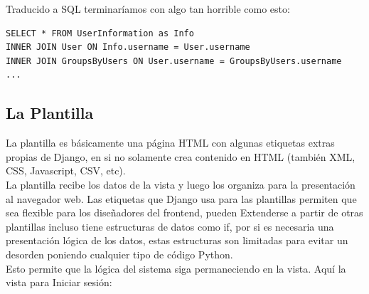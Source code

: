 \vspace{0.1cm}

Traducido a SQL terminaríamos con algo tan horrible como esto:\\[0.1cm]

\begin{lstlisting}[style=consola]
SELECT * FROM UserInformation as Info
INNER JOIN User ON Info.username = User.username
INNER JOIN GroupsByUsers ON User.username = GroupsByUsers.username
...
\end{lstlisting}

\vspace{0.1cm}


\subsection{La Plantilla}

La plantilla es básicamente una página HTML con algunas etiquetas extras propias de Django, en si no solamente crea contenido en HTML (también XML, CSS, Javascript, CSV, etc).\\[0.1cm]

La plantilla recibe los datos de la vista y luego los organiza para la presentación al navegador web. Las etiquetas que Django usa para las plantillas permiten que sea flexible para los diseñadores del frontend, pueden Extenderse a partir de otras plantillas incluso tiene estructuras de datos como if, por si es necesaria una presentación lógica de los datos, estas estructuras son limitadas para evitar un desorden poniendo cualquier tipo de código Python.\\[0.1cm]

Esto permite que la lógica del sistema siga permaneciendo en la vista. Aquí la vista para Iniciar sesión:\\[0.1cm]

